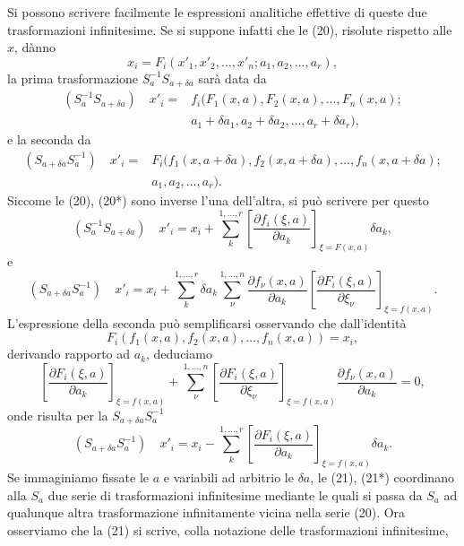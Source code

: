 \documentclass[11pt]{book}
\begin{document}
Si possono scrivere facilmente le espressioni analitiche effettive di queste due trasformazioni infinitesime. Se si suppone infatti che le (20), risolute rispetto alle $x$, dànno
\begin{equation*}\tag{20*}
 x_i=F_i(x'_1,x'_2,\ldots,x'_n; a_1,a_2,\ldots,a_r),
\end{equation*}
la prima trasformazione $S_a^{-1}S_{a+\delta a}$ sarà data da
\[
\begin{aligned}
(S_a^{-1}S_{a+\delta a})\quad x'_i={}&f_i\bigl(F_1(x,a),F_2(x,a),\ldots,F_n(x,a);\\
& a_1+\delta a_1,a_2+\delta a_2,\ldots,a_r+\delta a_r\bigr),
\end{aligned}
\]
e la seconda da
\[
\begin{aligned}
(S_{a+\delta a}S_a^{-1})\quad x'_i={}&F_i\bigl(f_1(x,a+\delta a),f_2(x,a+\delta a),\ldots,f_n(x,a+\delta a);\\
& a_1,a_2,\ldots,a_r\bigr).
\end{aligned}
\]
Siccome le (20), (20*) sono inverse l'una dell'altra, si può scrivere per questo
\begin{equation*}\tag{21}
(S_a^{-1}S_{a+\delta a})\quad
 x'_i=x_i+\sum\limits_k^{1,\ldots,r}\left[\frac{\partial f_i(\xi,a)}{\partial a_k}\right]_{\xi=F(x,a)}\delta a_k,
\end{equation*}
e
\[
(S_{a+\delta a}S_a^{-1})\quad
 x'_i=x_i+\sum\limits_k^{1,\ldots,r}\delta a_k\sum\limits_\nu^{1,\ldots,n}\frac{\partial f_\nu(x,a)}{\partial a_k}
 \left[\frac{\partial F_i(\xi,a)}{\partial \xi_\nu}\right]_{\xi=f(x,a)}.
\]
L'espressione della seconda può semplificarsi osservando che dall'identità
\[
 F_i(f_1(x,a),f_2(x,a),\ldots,f_n(x,a))=x_i,
\]
derivando rapporto ad $a_k$, deduciamo
\[
 \left[\frac{\partial F_i(\xi,a)}{\partial a_k}\right]_{\xi=f(x,a)}+
 \sum\limits_\nu^{1,\ldots,n}\left[\frac{\partial F_i(\xi,a)}{\partial \xi_\nu}\right]_{\xi=f(x,a)}\frac{\partial f_\nu(x,a)}{\partial a_k}=0,
\]
onde risulta per la $S_{a+\delta a}S_a^{-1}$
\begin{equation*}\tag{21*}
(S_{a+\delta a}S_a^{-1})\quad
 x'_i=x_i-\sum\limits_k^{1,\ldots,r}\left[\frac{\partial F_i(\xi,a)}{\partial a_k}\right]_{\xi=f(x,a)}\delta a_k.
\end{equation*}
Se immaginiamo fissate le $a$ e variabili ad arbitrio le $\delta a$, le (21), (21*) coordinano alla $S_a$ due serie di trasformazioni infinitesime mediante le quali si passa da $S_a$ ad qualunque altra trasformazione infinitamente vicina nella serie (20). Ora osserviamo che la (21) si scrive, colla notazione delle trasformazioni infinitesime,
\end{document}

